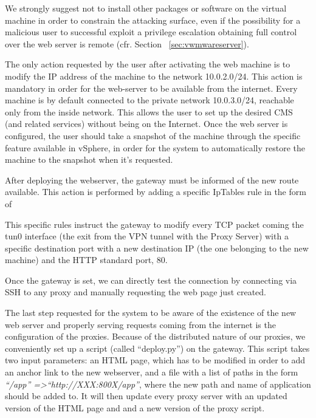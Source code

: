 We strongly suggest not to install other packages or software on the virtual machine in order to constrain the attacking surface, even if the possibility
for a malicious user to successful exploit a privilege escalation obtaining full control over the web server is remote (cfr. Section ~\ref{sec:vwmwareserver}).

The only action requested by the user after activating the web machine is to modify the IP address of the machine to the network 10.0.2.0/24. This action is mandatory in order for the web-server to be available from the internet. Every machine is by default connected to the private network 10.0.3.0/24, reachable only from the inside network. This allows the user to set up the desired CMS (and related services) without being on the Internet. Once the web server is configured, the user should take a snapshot of the machine through the specific feature available in vSphere, in order for the system to automatically restore the machine to the snapshot when it's requested.

After deploying the webserver, the gateway must be informed of the new route available. This action is performed by adding a specific IpTables rule in the form of
\begin{center}
\end{center}

This specific rules instruct the gateway to modify every TCP packet coming the tun0 interface (the exit from the VPN tunnel with the Proxy Server) with a specific destination port with a new destination IP (the one belonging to the new machine) and the HTTP standard port, 80.

Once the gateway is set, we can directly test the connection by connecting via SSH to any proxy and manually requesting the web page just created.

The last step requested for the system to be aware of the existence of the new web server and properly serving requests coming from the internet is the configuration of the proxies.
Because of the distributed nature of our proxies, we conveniently set up a script (called ``deploy.py'') on the gateway. This script takes two input parameters: an HTML page, which has to be modified in order to add an anchor link to the new webserver, and a file with a list of paths in the form \emph{``/app'' =\textgreater ``http://XXX:800X/app''}, where the new path and name of application should be added to. It will then update every proxy server with an updated version of the HTML page and and a new version of the proxy script.

